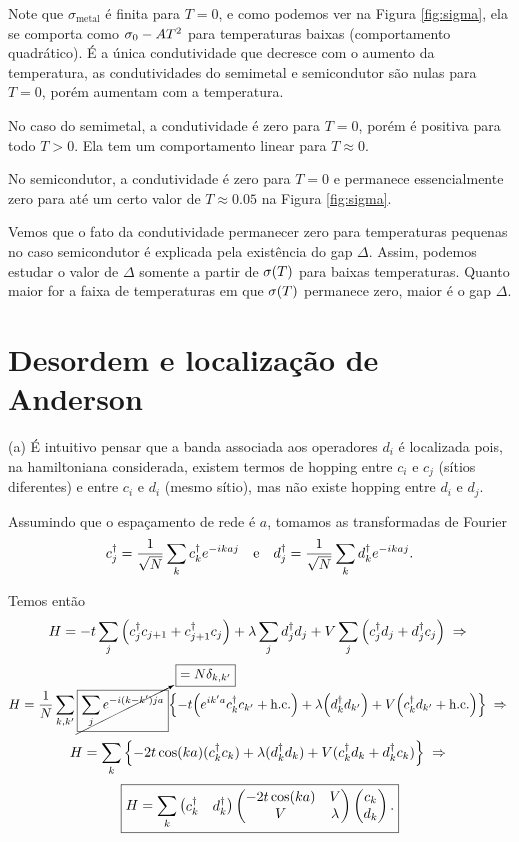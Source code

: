 \documentclass[a4paper,10pt]{article}
\begin{document}
Note que $\sigma_{\text{metal}}$ é finita para $T = 0$, e como podemos ver na Figura \ref{fig:sigma}, ela se comporta como $\sigma_0 - AT^2$ para temperaturas baixas (comportamento quadrático). É a única condutividade que decresce com o aumento da temperatura, as condutividades do semimetal e semicondutor são nulas para $T = 0$, porém aumentam com a temperatura.

No caso do semimetal, a condutividade é zero para $T = 0$, porém é positiva para todo $T > 0$. Ela tem um comportamento linear para $T \approx 0$.

No semicondutor, a condutividade é zero para $T = 0$ e permanece essencialmente zero para até um certo valor de $T \approx 0.05$ na Figura \ref{fig:sigma}.

Vemos que o fato da condutividade permanecer zero para temperaturas pequenas no caso semicondutor é explicada pela existência do gap $\Delta$. Assim, podemos estudar o valor de $\Delta$ somente a partir de $\sigma(T)$ para baixas temperaturas. Quanto maior for a faixa de temperaturas em que $\sigma(T)$ permanece zero, maior é o gap $\Delta$.

\pagebreak

\section{Desordem e localização de Anderson}

(a) É intuitivo pensar que a banda associada aos operadores $d_i$ é localizada pois, na hamiltoniana considerada, existem termos de hopping entre $c_i$ e $c_j$ (sítios diferentes) e entre $c_i$ e $d_i$ (mesmo sítio), mas não existe hopping entre $d_i$ e $d_j$.

Assumindo que o espaçamento de rede é $a$, tomamos as transformadas de Fourier
$$
c_j^\dagger = \frac{1}{\sqrt{N}} \sum_{k} c_k^\dagger e^{-ikaj} \quad \mathrm{e} \quad
d_j^\dagger = \frac{1}{\sqrt{N}} \sum_{k} d_k^\dagger e^{-ikaj}.
$$

Temos então
$$
H = -t \sum_{j} \qty(c_j^\dagger c_{j+1} + c_{j+1}^\dagger c_j) +
\lambda \sum_{j} d_j^\dagger d_j +
V \sum_{j} \qty(c_j^\dagger d_j + d_j^\dagger c_j) \; \Rightarrow \;
$$
$$
H = \frac{1}{N} \sum_{k,k'}
\cancelto{\boxed{= N \delta_{k,k'}}}{\boxed{\sum_{j} e^{-i(k-k')ja}}}
\qty{
-t \qty(e^{ik'a} c_k^\dagger c_{k'} + \text{h.c.}) +
\lambda \qty(d_k^\dagger d_{k'}) +
V \qty(c_k^\dagger d_{k'} + \text{h.c.})
} \; \Rightarrow \;
$$
$$
H = \sum_{k}
\qty{
-2t \cos(ka) (c_k^\dagger c_k) +
\lambda (d_k^\dagger d_k) +
V (c_k^\dagger d_k + d_k^\dagger c_k)
} \; \Rightarrow \;
$$
$$
\boxed{ H = \sum_{k}
\begin{pmatrix}
c_k^\dagger & d_k^\dagger
\end{pmatrix}
\begin{pmatrix}
-2t \cos(ka) & V \\
V & \lambda
\end{pmatrix}
\begin{pmatrix}
c_k \\ d_k
\end{pmatrix}. }
$$
\end{document}
